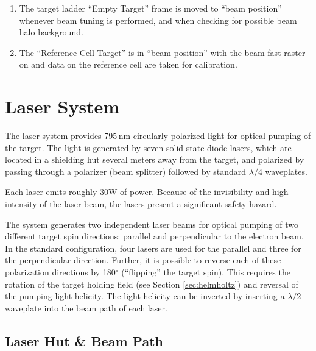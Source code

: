 \begin{safetyen}{10}{5}
\begin{enumerate}
\item 
The target ladder ``Empty Target''
 frame is moved to ``beam position'' whenever
beam tuning is performed, and when checking for possible beam halo
background.

\item  
The ``Reference Cell Target'' is in ``beam position'' with the beam fast
raster on and data on the reference cell are taken for calibration.


\end{enumerate}

\end{safetyen}
\section{Laser System}
\label{sec:lasers}

The laser system provides 795\,nm circularly polarized light for optical
pumping of the target. The light is generated by seven solid-state
diode lasers, which are located in a shielding hut several meters 
away from the target, and polarized by passing through a polarizer 
(beam splitter) followed by standard $\lambda/4$ waveplates.  
\begin{safetyen}{10}{5}
Each laser emits roughly 30W of
power.  Because of the invisibility and high intensity of the
laser beam, the lasers present a significant safety hazard.
\end{safetyen}
The system generates two independent laser beams for optical
pumping of two different target spin directions: parallel
and perpendicular to the electron beam.  In the standard
configuration, four lasers are used for the parallel and three for the
perpendicular direction.  Further, it is possible to reverse each of these
polarization directions by 180$^\circ$ (``flipping'' the target spin). 
This requires the rotation of the target holding field (see Section
\ref{sec:helmholtz}) and reversal of the pumping light helicity.  
The light helicity can be inverted by inserting a $\lambda/2$ waveplate 
into the beam path of each laser.

\subsection{Laser Hut \& Beam Path}
\label{sec:las}

